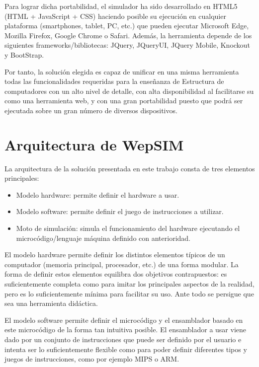 Para lograr dicha portabilidad, el simulador ha sido desarrollado en HTML5 (HTML + JavaScript + CSS) haciendo posible su ejecución en cualquier plataforma (smartphones, tablet, PC, etc.) que pueden ejecutar Microsoft Edge, Mozilla Firefox, Google Chrome o Safari. Además, la herramienta depende de los siguientes frameworks/bibliotecas: JQuery, JQueryUI, JQuery Mobile, Knockout y BootStrap.

Por tanto, la solución elegida es capaz de unificar en una misma herramienta todas las funcionalidades requeridas para la enseñanza de Estructura de computadores con un alto nivel de detalle, con alta disponibilidad al facilitarse su como una herramienta web, y con una gran portabilidad puesto que podrá ser ejecutada sobre un gran número de diversos dispositivos.



\section{Arquitectura de WepSIM}
\label{sec:simulator_architecture}

La arquitectura de la solución presentada en este trabajo consta de tres elementos principales:

\begin{itemize}
\item Modelo hardware: permite definir el hardware a usar.
\item Modelo software: permite definir el juego de instrucciones a utilizar.
\item Moto de simulación: simula el funcionamiento del hardware ejecutando el microcódigo/lenguaje máquina definido con anterioridad.
\end{itemize}

El modelo hardware permite definir los distintos elementos típicos de un computador (memoria principal, procesador, etc.) de una forma modular. La forma de definir estos elementos equilibra dos objetivos contrapuestos: es suficientemente completa como para imitar los principales aspectos de la realidad, pero es lo suficientemente mínima para facilitar su uso. Ante todo se persigue que sea una herramienta didáctica.

El modelo software permite definir el microcódigo y el ensamblador basado en este microcódigo de la forma tan intuitiva posible. El ensamblador a usar viene dado por un conjunto de instrucciones que puede ser definido por el usuario e intenta ser lo suficientemente flexible como para poder definir diferentes tipos y juegos de instrucciones, como por ejemplo MIPS o ARM.

